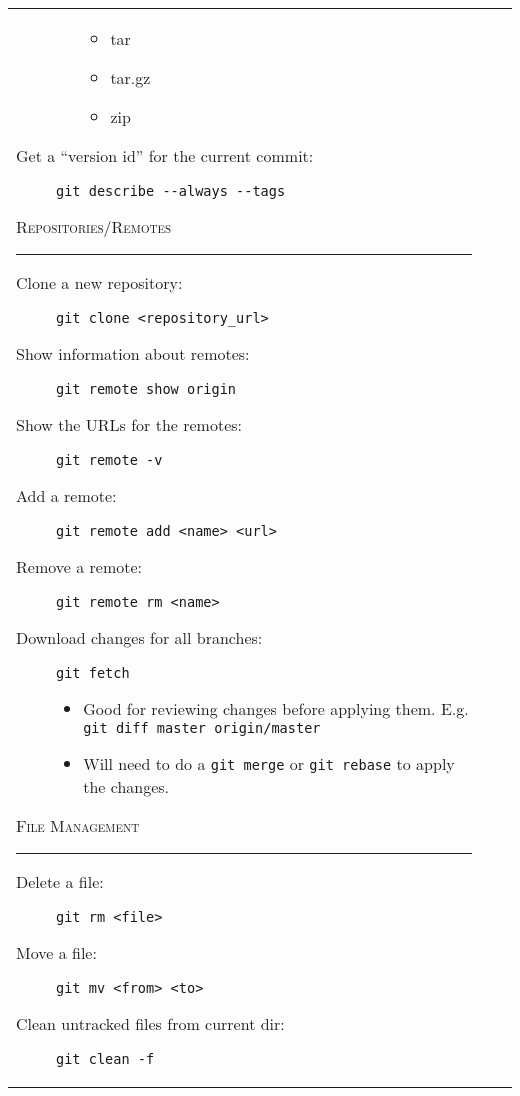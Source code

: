 \documentclass[landscape]{article}
\begin{document}
\begin{tabular*}{10.5in}{|p{2.9in}|p{2.9in}|p{2.9in}|}
\begin{flushleft}
\begin{description}
\begin{itemize}
                         \begin{itemize}
                             \item{tar}
                             \item{tar.gz}
                             \item{zip}
                         \end{itemize}
                 \end{itemize}
             \item[Get a ``version id'' for the current commit:]
                 {\verb!git describe --always --tags!}
        \end{description}
        \textsc{Repositories/Remotes}
        \rule{2.9in}{.5pt}
        \small
        \begin{description}
            \item[Clone a new repository:]
                {\verb!git clone <repository_url>!}
            \item[Show information about remotes:]
                {\verb!git remote show origin!}
            \item[Show the URLs for the remotes:]
                {\verb!git remote -v!}
            \item[Add a remote:]
                {\verb!git remote add <name> <url>!}
            \item[Remove a remote:]
                {\verb!git remote rm <name>!}
            \item[Download changes for all branches:]
                {\verb!git fetch!}
                \begin{itemize}
                    \item{Good for reviewing changes before applying them.
                          E.g. \verb!git diff master origin/master!}
                    \item{Will need to do a \verb!git merge! or
                        \verb!git rebase! to apply the changes.}
                \end{itemize}
        \end{description}
        \textsc{File Management}
        \rule{2.9in}{.5pt}
        \small
        \begin{description}
            \item[Delete a file:]
                {\verb!git rm <file>!}
            \item[Move a file:]
                {\verb!git mv <from> <to>!}
            \item[Clean untracked files from current dir:]
                {\verb!git clean -f!}
        \end{description}
    \end{flushleft}
\end{tabular*}
\end{document}
